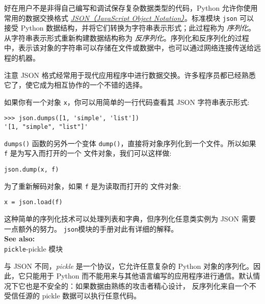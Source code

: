 好在用户不是非得自己编写和调试保存复杂数据类型的代码，Python 允许你使用常用的数据交换格式 \href{http://json.org/}{\textit{JSON（JavaScript Object Notation）}}。标准模块 \texttt{json} 可以接受 Python 数据结构，并将它们转换为字符串表示形式；此过程称为 \textit{序列化}。从字符串表示形式重新构建数据结构称为 \textit{反序列化}。序列化和反序列化的过程中，表示该对象的字符串可以存储在文件或数据中，也可以通过网络连接传送给远程的机器。
\begin{Warning}{注意}
JSON 格式经常用于现代应用程序中进行数据交换。许多程序员都已经熟悉它了，使它成为相互协作的一个不错的选择。
\end{Warning}
如果你有一个对象 \verb|x|，你可以用简单的一行代码查看其 JSON 字符串表示形式:
\begin{lstlisting}
>>> json.dumps([1, 'simple', 'list'])
'[1, "simple", "list"]'
\end{lstlisting}
\texttt{dumps()} 函数的另外一个变体 \texttt{dump()}，直接将对象序列化到一个文件。所以如果 \texttt{f} 是为写入而打开的一个 文件对象，我们可以这样做:
\begin{lstlisting}
json.dump(x, f)
\end{lstlisting}
为了重新解码对象，如果 \texttt{f} 是为读取而打开的 文件对象:
\begin{lstlisting}
x = json.load(f)
\end{lstlisting}
这种简单的序列化技术可以处理列表和字典，但序列化任意类实例为 JSON 需要一点额外的努力。 \texttt{json}模块的手册对此有详细的解释。\\
\textbf{See also:}\\
\verb|pickle|-pickle 模块

与 JSON 不同，\textit{pickle} 是一个协议，它允许任意复杂的 Python 对象的序列化。因此，它只能用于 Python 而不能用来与其他语言编写的应用程序进行通信。默认情况下它也是不安全的：如果数据由熟练的攻击者精心设计， 反序列化来自一个不受信任源的 pickle 数据可以执行任意代码。